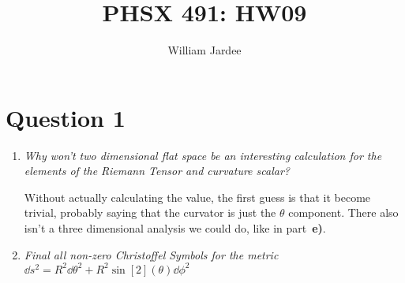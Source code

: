 \documentclass[11pt]{article}
\begin{document}
\title{PHSX 491: HW09}
\author{William Jardee}
\maketitle

\section*{Question 1}
\begin{enumerate}[label=\alph*)]
\item \textit{Why won't two dimensional flat space be an interesting calculation for the elements of the Riemann Tensor and curvature scalar?}

Without actually calculating the value, the first guess is that it become trivial, probably saying that the curvator is just the $\theta$ component. There also isn't a three dimensional analysis we could do, like in part~\textbf{e)}.

\item \textit{Final all non-zero Christoffel Symbols for the metric } $\displaystyle{\dd{s^2} = R^2 \dd{\theta^2} + R^2\sin[2](\theta)\dd{\phi^2}}$


\end{enumerate}
\end{document}
